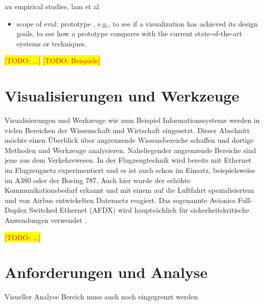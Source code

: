 \documentclass[draft=false
              ,paper=a4
              ,twoside=false
              ,fontsize=11pt
              ,headsepline
              ,BCOR10mm
              ,DIV11
              ]{scrbook}
\newcommand{\TODO}[1]{\colorbox{yellow}{\textcolor{red}{[TODO: #1]}}}
\begin{document}
au empirical studies, lam et al
\begin{itemize}
  \item scope of eval: prototype , e.g., to see if a visualization has achieved
its design goals, to see how a prototype compares with
the current state-of-the-art systems or techniques.
\end{itemize}
\TODO{...}
\TODO{Beispiele}

\section{Visualisierungen und Werkzeuge} %
\label{sec:visualisierungen_und_werkzeuge}

Visualisierungen und Werkzeuge wie zum Beispiel Informationssysteme werden in vielen Bereichen der Wissenschaft und Wirtschaft eingesetzt. Dieser Abschnitt möchte einen Überblick über angrenzende Wissensbereiche schaffen und dortige Methoden und Werkzeuge analysieren. 
Naheliegender angrenzende Bereiche sind jene aus dem Verkehrswesen. In der Flugzeugtechnik wird bereits mit Ethernet im Flugzeugnetz experimentiert und es ist auch schon im Einsatz, beispielsweise im A380 oder der Boeing 787. Auch hier wurde der erhöhte Kommunikationsbedarf erkannt und mit einem auf die Luftfahrt spezialisiertem und von Airbus entwickelten Datennetz reagiert. Das sogenannte Avionics Full-Duplex Switched Ethernet (AFDX) wird hauptsächlich für sicherheitskritische Anwendungen verwendet \cite{steiner_recent_2014}. 


\TODO{...}


\section{Anforderungen und Analyse} %
\label{sec:anforderungen_und_analyse}

Visueller Analyse Bereich muss auch noch eingegrenzt werden

\end{document}
